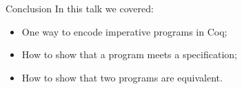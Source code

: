 \begin{frame}{Conclusion}
In this talk we covered:

\begin{itemize}
\item One way to encode imperative programs in Coq;
\item How to show that a program meets a specification;
\item How to show that two programs are equivalent.
\end{itemize}
\end{frame}
